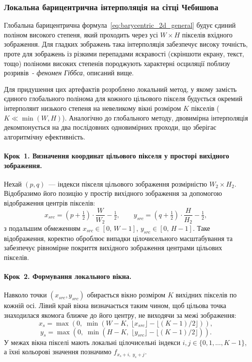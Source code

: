 \subsubsection{Локальна барицентрична інтерполяція на сітці Чебишова}

Глобальна барицентрична формула~\eqref{eq:barycentric_2d_general}
будує єдиний поліном високого степеня, який проходить через усі $W
\times H$ пікселів вхідного зображення. Для гладких зображень така
інтерполяція забезпечує високу точність, проте для зображень із різкими
перепадами яскравості (скріншоти екрану, текст, тощо) поліноми
високих степенів породжують характерні осциляції поблизу розривів~-
\textit{феномен Гіббса}, описаний вище.

Для придушення цих артефактів розроблено локальний метод, у якому
замість єдиного глобального полінома для кожного цільового пікселя
будується окремий інтерполянт низького степеня на невеликому вікні розміром $K$ пікселів ($K \ll \min(W, H)$).
Аналогічно до глобального методу, двовимірна інтерполяція декомпонується
на два послідовних одновимірних проходи, що зберігає алгоритмічну
ефективність.

\paragraph{Крок~1. Визначення координат цільового пікселя у просторі
	вихідного зображення.}
Нехай $(p, q)$~--- індекси пікселя цільового зображення розмірністю
$W_2 \times H_2$. Відобразимо його позицію у простір вихідного зображення
за допомогою відображення центрів пікселів:
\begin{equation}
	x_{src} = \left(p + \tfrac{1}{2}\right) \cdot \frac{W}{W_2}
	- \tfrac{1}{2}, \qquad
	y_{src} = \left(q + \tfrac{1}{2}\right) \cdot \frac{H}{H_2}
	- \tfrac{1}{2},
	\label{eq:src_coords}
\end{equation}
з подальшим обмеженням $x_{src} \in [0,\, W - 1]$,
$y_{src} \in [0,\, H - 1]$. Таке відображення, коректно
оброблює випадки цілочисельного масштабування та забезпечує рівномірне
покриття вихідного зображення центрами цільових пікселів.

\paragraph{Крок~2. Формування локального вікна.}
Навколо точки $(x_{src}, y_{src})$ обирається вікно розміром $K$
вихідних пікселів по кожній осі. Лівий край вікна визначається таким
чином, щоб цільова точка знаходилася якомога ближче до його центру,
не виходячи за межі зображення:
\begin{equation}
	x_s = \max\!\left(0,\;\min\!\left(W - K,\;
	\lfloor x_{src} \rfloor - \lfloor(K-1)/2\rfloor
	\right)\right),
	\label{eq:xstart}
\end{equation}
\begin{equation}
	y_s = \max\!\left(0,\;\min\!\left(H - K,\;
	\lfloor y_{src} \rfloor - \lfloor(K-1)/2\rfloor
	\right)\right).
	\label{eq:ystart}
\end{equation}
У межах вікна пікселі мають локальні цілочисельні індекси
$i, j \in \{0, 1, \ldots, K{-}1\}$, а їхні кольорові значення
позначимо $f_{x_s + i,\; y_s + j}$.


